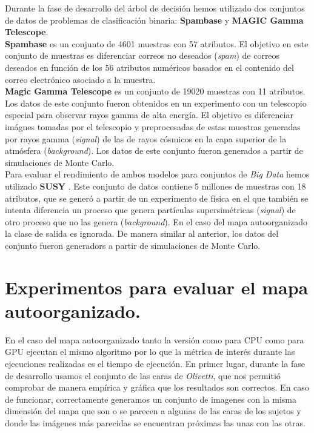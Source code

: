 Durante la fase de desarrollo del árbol de decisión hemos utilizado dos conjuntos de datos de problemas de clasificación binaria: \textbf{Spambase} y \textbf{MAGIC Gamma Telescope}.\\

\textbf{Spambase} \cite{spambase} es un conjunto de 4601 muestras con 57 atributos. El objetivo en este conjunto de muestras es diferenciar correos no deseados (\textit{spam}) de correos deseados en función de los 56 atributos numéricos basados en el contenido del correo electrónico asociado a la muestra.\\

\textbf{Magic Gamma Telescope} \cite{magic04} es un conjunto de 19020 muestras con 11 atributos. Los datos de este conjunto fueron obtenidos en un experimento con un telescopio especial para observar rayos gamma de alta energía. El objetivo es diferenciar imágnes tomadas por el telescopio y preprocesadas de estas muestras generadas por rayos gamma (\textit{signal}) de las de rayos cósmicos en la capa superior de la atmósfera (\textit{background}). Los datos de este conjunto fueron generados a partir de simulaciones de Monte Carlo.\\

Para evaluar el rendimiento de ambos modelos para conjuntos de \textit{Big Data} hemos utilizado \textbf{SUSY} \cite{susy}. Este conjunto de datos contiene 5 millones de muestras con 18 atributos, que se generó a partir de un experimento de física en el que también se intenta diferencia un proceso que genera partículas supersimétricas (\textit{signal}) de otro proceso que no las genera (\textit{background}). En el caso del mapa autoorganizado la clase de salida es ignorada. De manera similar al anterior, los datos del conjunto fueron generadors a partir de simulaciones de Monte Carlo.


\section{Experimentos para evaluar el mapa autoorganizado.}
En el caso del mapa autoorganizado tanto la versión como para CPU como para GPU ejecutan el mismo algoritmo por lo que la métrica de interés durante las ejecuciones realizadas es el tiempo de ejecución. En primer lugar, durante la fase de desarrollo usamos el conjunto de las caras de \textit{Olivetti}, que nos permitió comprobar de manera empírica y gráfica que los resultados son correctos. En caso de funcionar, correctamente generamos un conjunto de imagenes con la misma dimensión del mapa que son o se parecen a algunas de las caras de los sujetos y donde las imágenes más parecidas se encuentran próximas las unas con las otras. \\

